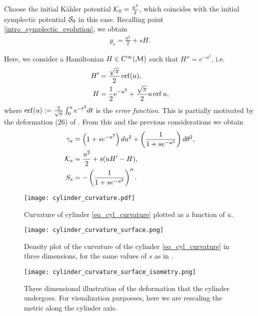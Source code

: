 \documentclass[notas.tex]{subfiles}
\begin{document}
Choose the initial Kähler potential $\mathcal{K}_0 = \frac{u^2}{2}$, which coincides with the initial symplectic potential $\mathcal{S}_0$ in this case. Recalling point \eqref{intro_symplectic_evolution}, we obtain
\begin{align*}
	g_{s} = \frac{u^2}{2} + sH.
\end{align*}


Here, we consider a Hamiltonian $H \in C^\infty(\mathcal{M})$ such that $H'' = e^{-u^2}$, i.e.
\begin{align*}
	H' &= \frac{\sqrt{\pi}}{2}\operatorname{erf}(u), \\
	H &= \frac{1}{2}e^{- u^2} + \frac{\sqrt{\pi}}{2}u\operatorname{erf}{u},
\end{align*}
where $\operatorname{erf}(u) := \frac{2}{\sqrt{\pi}}\int_0^u e^{-t^2} dt$ is the \emph{error function}. This is partially motivated by the deformation (26) of \cite{johri_probing_2016}. From this and the previous considerations we obtain
\begin{align}
	\gamma_s &= \left( 1 + se^{-u^2} \right) du^2 + \left( \frac{1}{1+se^{-u^2}} \right) d\theta^2, \\ \nonumber
	\mathcal{K}_s &= \frac{u^2}{2} + s (u H' - H), \nonumber \\
	S_s &= - \left( \frac{1}{1+se^{-u^2}} \right)''. \label{eq_cyl_curvature}
\end{align}
\begin{figure}[htbp]
	\centering
	\texttt{[image: cylinder\_curvature.pdf]}
	\caption{Curvature of cylinder \eqref{eq_cyl_curvature} plotted as a function of $u$.}
	\label{fig_cylinder_curvature}
\end{figure}
\begin{figure}[htbp]
	\centering
	\texttt{[image: cylinder\_curvature\_surface.png]}
	\caption{Density plot of the curvature of the cylinder \eqref{eq_cyl_curvature} in three dimensions, for the same values of $s$ as in .}
	\label{fig_cylinder_curvature_surface}
\end{figure}
\begin{figure}[htbp]
	\centering
	\texttt{[image: cylinder\_curvature\_surface\_isometry.png]}
	\caption{Three dimensional illustration of the deformation that the cylinder undergoes. For visualization purpoeses, here we are rescaling the metric along the cylinder axis.}
	\label{fig_cylinder_curvature_illustration}
\end{figure}
\end{document}
